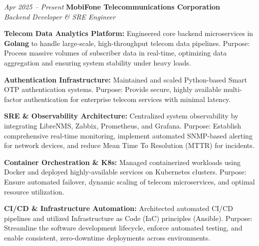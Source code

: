 \begin{twocolentry}{\textit{Apr 2025 -- Present}}
    \textbf{MobiFone Telecommunications Corporation} \\[4pt]
    \textit{Backend Developer \& SRE Engineer}
\end{twocolentry}
\begin{onecolentry}
    \begin{highlights}
        \item \textbf{Telecom Data Analytics Platform:} Engineered core backend microservices in \textbf{Golang} to handle large-scale, high-throughput telecom data pipelines. Purpose: Process massive volumes of subscriber data in real-time, optimizing data aggregation and ensuring system stability under heavy loads.
        \item \textbf{Authentication Infrastructure:} Maintained and scaled Python-based Smart OTP authentication systems. Purpose: Provide secure, highly available multi-factor authentication for enterprise telecom services with minimal latency.
        \item \textbf{SRE \& Observability Architecture:} Centralized system observability by integrating LibreNMS, Zabbix, Prometheus, and Grafana. Purpose: Establish comprehensive real-time monitoring, implement automated SNMP-based alerting for network devices, and reduce Mean Time To Resolution (MTTR) for incidents.
        \item \textbf{Container Orchestration \& K8s:} Managed containerized workloads using Docker and deployed highly-available services on Kubernetes clusters. Purpose: Ensure automated failover, dynamic scaling of telecom microservices, and optimal resource utilization.
        \item \textbf{CI/CD \& Infrastructure Automation:} Architected automated CI/CD pipelines and utilized Infrastructure as Code (IaC) principles (Ansible). Purpose: Streamline the software development lifecycle, enforce automated testing, and enable consistent, zero-downtime deployments across environments.
    \end{highlights}
\end{onecolentry}
\vspace{0.2 cm}

